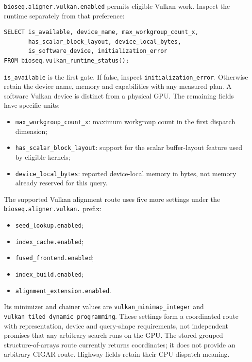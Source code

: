 \texttt{bioseq.aligner.vulkan.enabled} permits eligible Vulkan work. Inspect
the runtime separately from that preference:

\par\noindent\begin{minipage}{\linewidth}
\begin{lstlisting}[style=bioseq-appendix-sql]
SELECT is_available, device_name, max_workgroup_count_x,
       has_scalar_block_layout, device_local_bytes,
       is_software_device, initialization_error
FROM bioseq.vulkan_runtime_status();
\end{lstlisting}
\end{minipage}

\texttt{is\_available} is the first gate. If false, inspect
\texttt{initialization\_error}. Otherwise retain the device name, memory and
capabilities with any measured plan. A software Vulkan device is distinct
from a physical GPU. The remaining fields have specific units:
\begin{itemize}
  \item \texttt{max\_workgroup\_count\_x}: maximum workgroup count in
    the first dispatch dimension;
  \item \texttt{has\_scalar\_block\_layout}: support for the scalar
    buffer-layout feature used by eligible kernels;
  \item \texttt{device\_local\_bytes}: reported device-local memory in
    bytes, not memory already reserved for this query.
\end{itemize}

The supported Vulkan alignment route uses five more settings under the
\nolinkurl{bioseq.aligner.vulkan.} prefix:
\begin{itemize}
  \item \nolinkurl{seed_lookup.enabled};
  \item \nolinkurl{index_cache.enabled};
  \item \nolinkurl{fused_frontend.enabled};
  \item \nolinkurl{index_build.enabled};
  \item \nolinkurl{alignment_extension.enabled}.
\end{itemize}
Its minimizer and chainer values are \nolinkurl{vulkan_minimap_integer} and
\nolinkurl{vulkan_tiled_dynamic_programming}. These settings form a coordinated route
with representation, device and query-shape requirements, not independent
promises that any arbitrary search runs on the GPU. The stored grouped
structure-of-arrays route currently returns coordinates; it does not provide
an arbitrary CIGAR route. Highway fields retain their CPU dispatch meaning.

